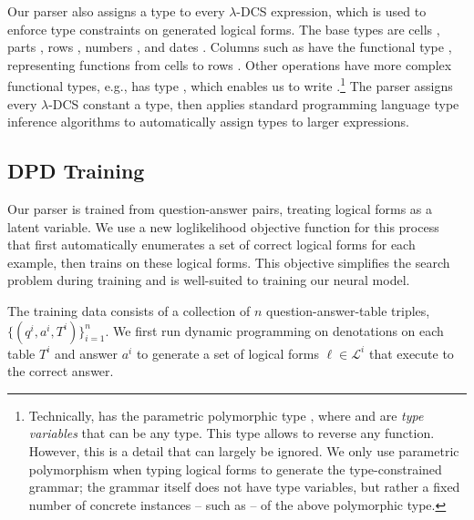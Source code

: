 Our parser also assigns a type to every $\lambda$-DCS expression, which is used 
to enforce type constraints on generated logical forms.
The base types are cells , parts , rows , numbers 
, and dates .
Columns such as  have the functional type , 
representing functions from cells  to rows .
Other operations have more complex functional types, e.g.,  has 
type
, which enables us to write .\footnote{Technically,  has the parametric polymorphic 
type \func{\func{\alpha}{\beta}}{\func{\beta}{\alpha}}, where \type{\alpha} and 
\type{\beta} are \emph{type variables} that can be any type. This type allows 
 to reverse any function. However, this is a detail that can 
largely be ignored. We only use parametric polymorphism when typing logical 
forms to generate the type-constrained grammar; the grammar itself does not 
have 
type variables, but rather a fixed number of concrete instances -- such as 
 -- of the above polymorphic type.}
The parser assigns every $\lambda$-DCS constant a type, then applies standard 
programming language type inference algorithms \citep{Pierce2002TypesAP} to 
automatically assign types to larger expressions.

\subsection{DPD Training}
\label{sec:nnsp_training}

Our parser is trained from question-answer pairs, treating logical forms as a 
latent variable. We use a new loglikelihood objective function for this process 
that first automatically enumerates a set of correct logical forms for each 
example, then trains on these logical forms. This objective simplifies the 
search problem during training and is well-suited to training our neural model.

The training data consists of a collection of $n$ question-answer-table 
triples, 
$\{(q^i, a^i, T^i)\}_{i=1}^n$. We first run dynamic programming on denotations 
\citep{pasupat2016inferring} on each table $T^i$ and answer $a^i$ to generate a 
set of 
logical forms $\ell \in \mathcal{L}^i$ that execute to the correct answer.

